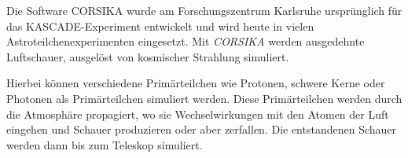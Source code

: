 Die Software CORSIKA \cite{CORSIKA} wurde am Forschungszentrum Karlsruhe ursprünglich für das KASCADE-Experiment entwickelt und wird heute in vielen Astroteilchenexperimenten eingesetzt.
Mit \textit{CORSIKA} werden ausgedehnte Luftschauer, ausgelöst von kosmischer Strahlung simuliert.

Hierbei können verschiedene Primärteilchen wie Protonen, schwere Kerne oder Photonen als Primärteilchen simuliert werden.
Diese Primärteilchen werden durch die Atmosphäre propagiert, wo sie Wechselwirkungen mit den Atomen der Luft eingehen und Schauer produzieren oder aber zerfallen.
Die entstandenen Schauer werden dann bis zum Teleskop simuliert.



